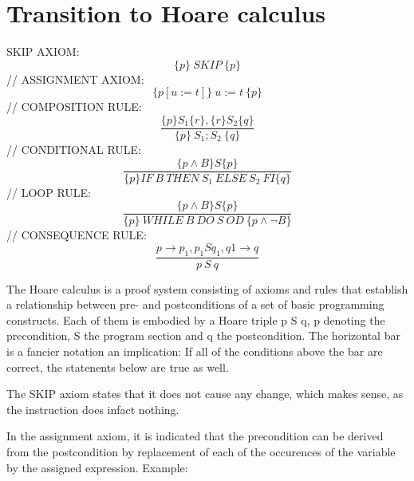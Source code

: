 \section{Transition to Hoare calculus}
SKIP AXIOM:
	\begin{equation}
		\{p\}\ SKIP\ \{p\}
	\end{equation}
//
ASSIGNMENT AXIOM:
	\begin{equation}
		\{p[u:=t]\}\ u:=t\ \{p\}
	\end{equation}
//
COMPOSITION RULE:
	\begin{equation}
		\dfrac{\{p\}S_1\{r\},\{r\}S_2\{q\}}{\{p\}\ S_1;S_2\ \{q\}}
	\end{equation}
//
CONDITIONAL RULE:
	\begin{equation}
		\dfrac{\{p\wedge B\} S \{p\}}{\{p\} IF\ B\ THEN\ S_1\ ELSE\ S_2\ FI\{q\}}
	\end{equation}
//
LOOP RULE:
	\begin{equation}
		\dfrac{\{p \wedge B\}S\{p\}}{\{p\}\ WHILE\ B\ DO\ S\ OD\ \{p \wedge \neg B\}}
	\end{equation}
//
CONSEQUENCE RULE:
	\begin{equation}
		\dfrac{p \to p_1,{p_1}S{q_1},q1 \to q}{{p}\ S\ {q}}
	\end{equation}

The Hoare calculus is a proof system consisting of axioms and rules that establish a relationship between pre- and postconditions of a set of basic programming constructs. Each of them is embodied by a Hoare triple {p} S {q}, p denoting the precondition, S the program section and q the postcondition. The horizontal bar is a fancier notation an implication: If all of the conditions above the bar are correct, the statenents below are true as well.

The SKIP axiom states that it does not cause any change, which makes sense, as the instruction does infact nothing.

In the assignment axiom, it is indicated that the precondition can be derived from the postcondition by replacement of each of the occurences of the variable by the assigned expression. Example:

%

